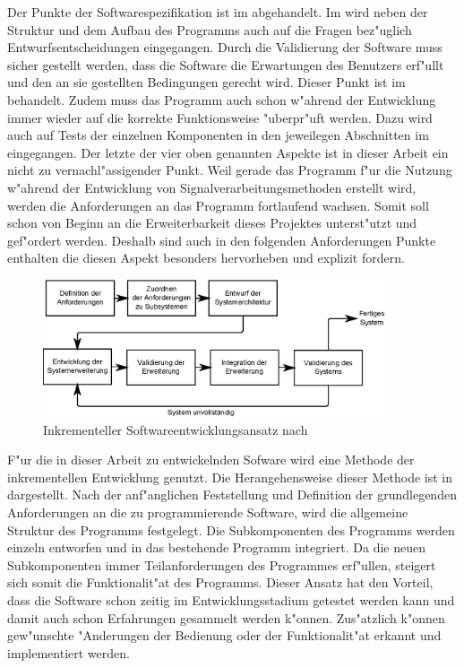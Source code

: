 Der Punkte der Softwarespezifikation ist im  abgehandelt.
Im  wird neben der Struktur und dem Aufbau des Programms auch auf die Fragen bez"uglich Entwurfsentscheidungen eingegangen.
Durch die Validierung der Software muss sicher gestellt werden, dass die Software die Erwartungen des Benutzers erf"ullt und den an sie gestellten Bedingungen gerecht wird.
Dieser Punkt ist im  behandelt.
Zudem muss das Programm auch schon w"ahrend der Entwicklung immer wieder auf die korrekte Funktionsweise "uberpr"uft werden.
Dazu wird auch auf Tests der einzelnen Komponenten in den jeweilegen Abschnitten im  eingegangen.
Der letzte der vier oben genannten Aspekte ist in dieser Arbeit ein nicht zu vernachl"assigender Punkt.
Weil gerade das Programm f"ur die Nutzung w"ahrend der Entwicklung von Signalverarbeitungsmethoden erstellt wird, werden die Anforderungen an das Programm fortlaufend wachsen.
Somit soll schon von Beginn an die Erweiterbarkeit dieses Projektes unterst"utzt und gef"ordert werden.
Deshalb sind auch in den folgenden Anforderungen Punkte enthalten die diesen Aspekt besonders hervorheben und explizit fordern.

\begin{figure}[b]
\centering
\includegraphics[width=0.9\textwidth]{bilder/inkrementelle_entwicklung.eps}
\caption{Inkrementeller Softwareentwicklungsansatz nach \cite{Sommerville2001a}}
\label{pic:inkrementelle_entwicklung}
\end{figure}
F"ur die in dieser Arbeit zu entwickelnden Sofware wird eine Methode der inkrementellen Entwicklung genutzt.
Die Herangehensweise dieser Methode ist in  dargestellt.
Nach der anf"anglichen Feststellung und Definition der grundlegenden Anforderungen an die zu programmierende Software, wird die allgemeine Struktur des Programms festgelegt.
Die Subkomponenten des Programms werden einzeln entworfen und in das bestehende Programm integriert.
Da die neuen Subkomponenten immer Teilanforderungen des Programmes erf"ullen, steigert sich somit die Funktionalit"at des Programms.
Dieser Ansatz hat den Vorteil, dass die Software schon zeitig im Entwicklungsstadium getestet werden kann und damit auch schon Erfahrungen gesammelt werden k"onnen.
Zus"atzlich k"onnen gew"unschte "Anderungen der Bedienung oder der Funktionalit"at erkannt und implementiert werden.


